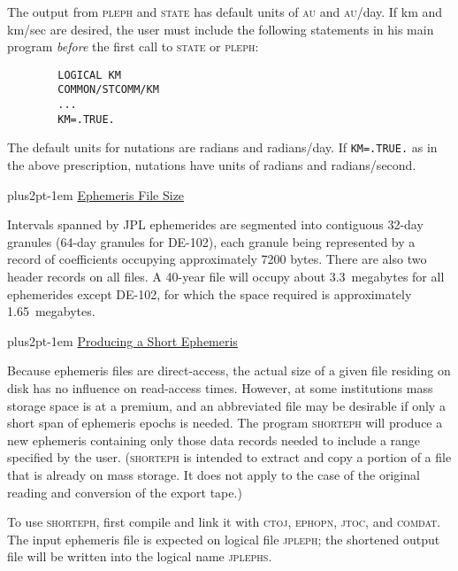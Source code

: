 \documentclass[twoside,11pt]{article}
\renewcommand{\_}{\texttt{\symbol{95}}}
\newcommand{\hdg}[1]{\vskip4pt plus2pt\leavevmode\kern-1em \underline{\large{#1}}\par}
\newcommand{\hdg}[1]{\subsection*{{#1}}}
\begin{document}
The output from \textsc{pleph} and \textsc{state}
has default units of \textsc{au} and \textsc{au}/day. If km and km/sec
are desired, the user must include the following statements
in his main program \textit{before\/} the first call to \textsc{state}
or \textsc{pleph}:

%

\begin{verbatim}
        LOGICAL KM
        COMMON/STCOMM/KM
        ...
        KM=.TRUE.
\end{verbatim}

The default units for nutations are radians and radians/day. If
\texttt{KM=.TRUE.} as in the above prescription, nutations have units
of radians and radians/second.

\newpage                                             %

\hdg{Ephemeris File Size}

Intervals spanned by JPL ephemerides are segmented into contiguous
32-day granules (64-day granules for DE-102),
each granule being represented by a
record of coefficients occupying approximately 7200 bytes.
There are also two
header records on all files. A 40-year file will occupy about
3.3~megabytes for all ephemerides except DE-102, for which the
space required is approximately 1.65~megabytes.

\hdg{Producing a Short Ephemeris}

Because ephemeris files are direct-access, the actual size of a given
file residing on disk has no influence on read-access times.
However, at some institutions mass storage space is at a premium, and
an abbreviated file may be desirable if only a short span of ephemeris
epochs is needed. The program \textsc{shorteph} will produce a new
ephemeris containing only those data records needed to include
a range specified by the user. (\textsc{shorteph} is intended to
extract and copy a portion of a file that is already on mass storage.
It does not apply to the case of the original reading and
conversion of the export tape.)
 
To use \textsc{shorteph}, first compile and link it with \textsc{ctoj,
 ephopn, jtoc}, and \textsc{comdat}. The input ephemeris
file is expected on logical file \textsc{jpleph}; the shortened output file
will be written into the logical name \textsc{jplephs}.
 
\end{document}
